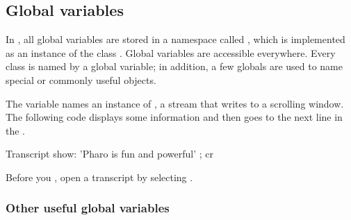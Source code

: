 \documentclass[a4paper,10pt,twoside]{book}
\begin{document}
\subsection{Global variables}
In \pharo, all global variables are stored in a namespace called , which is implemented as an instance of the class .
Global variables are accessible everywhere. 
Every class is named by a global variable; in addition, a few globals are used to name special or commonly useful objects.

The variable  names an instance of , a stream that writes to a scrolling window.
The following code displays some information and then goes to the next line in the .

\begin{code}{}
Transcript show: 'Pharo is fun and powerful' ; cr
\end{code}

\noindent
Before you , open a transcript by selecting .


\subsubsection{Other useful global variables}
\end{document}

